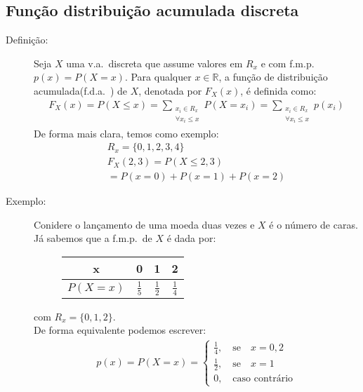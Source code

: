      \subsection{Função distribuição acumulada discreta}
     \begin{description}
       \item [Definição:] Seja $X$ uma v.a.\ discreta que assume valores em $R_{x}$ e com f.m.p.\
         $p(x)=P(X=x)$. Para qualquer $x \in \mathbb{R}$, a função de distribuição 
         acumulada(f.d.a.\ ) de $X$, denotada por $F_{X}(x)$, é definida como: 
         \begin{align}
           F_{X}(x)=P(X \leq x )= \sum \limits_{\substack{x_{i} \in R_{x}\\ \forall x_i \le x}} P(X=x_i) = \sum \limits_{\substack{x_{i} \in R_{x}\\ \forall x_i \le x}} p(x_i) 
         \end{align}
         De forma mais clara, temos como exemplo: 
         \begin{align*}
           R_{x}= \{0,1,2,3,4 \}\\
           F_{X}(2,3)= P(X\le 2,3)\\
           = P(x=0)+P(x=1)+P(x=2)
         \end{align*}
       \item [Exemplo:]
         Conidere o lançamento de uma moeda duas vezes e $X$ é o número de caras. Já sabemos
         que a f.m.p.\ de $X$ é dada por:
         \begin{figure} [H]
           \centering
           \begin{tabular}{c c c c}
             \toprule
             x&0&1&2\\ \midrule
             $P(X=x)$&$\frac{1}{5}$&$\frac{1}{2}$&$\frac{1}{4}$\\ \bottomrule
           \end{tabular}
           \label{tab:5}
         \end{figure}
         com $R_{x}=\{0,1,2\}$.\\
         De forma equivalente podemos escrever: 
         \begin{align*}
           p(x)=P(X=x)=
           \begin{cases}
             \frac{1}{4}, \quad \text{se} \quad x=0,2\\
             \frac{1}{2}, \quad \text{se} \quad x=1\\
             0,\quad  \text{caso contrário}

\end{cases}
\end{align*}
\end{description}

